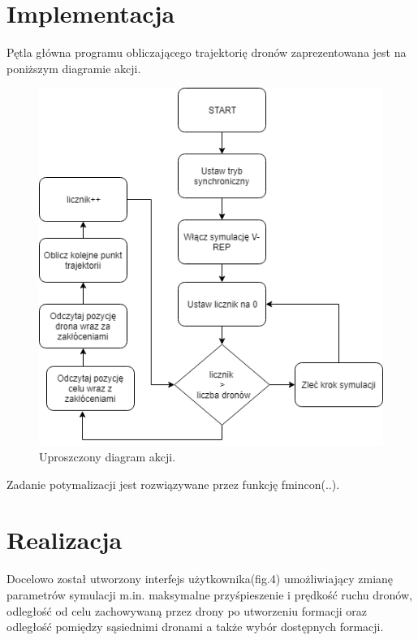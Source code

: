 \documentclass[a4paper, 11pt, oneside]{article}
\begin{document}
\section{Implementacja}
Pętla główna programu obliczającego trajektorię dronów zaprezentowana jest na poniższym diagramie akcji.
\begin{figure}[H]
\centering
\includegraphics[scale=0.5]{uproszczony_digram_akcji.png}
\caption{Uproszczony diagram akcji.}

\end{figure}
Zadanie potymalizacji jest rozwiązywane przez funkcję fmincon(..).
\newpage
\section{Realizacja}
Docelowo został utworzony interfejs użytkownika(fig.4) umożliwiający zmianę parametrów symulacji m.in. maksymalne przyśpieszenie i prędkość ruchu dronów, odległość od celu zachowywaną przez drony po utworzeniu formacji oraz odległość pomiędzy sąsiednimi dronami a także wybór dostępnych formacji.
\end{document}
